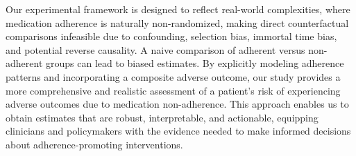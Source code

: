 Our experimental framework is designed to reflect real-world complexities, where medication adherence is naturally non-randomized, making direct counterfactual comparisons infeasible due to confounding, selection bias, immortal time bias, and potential reverse causality. 
A naive comparison of adherent versus non-adherent groups can lead to biased estimates. 
By explicitly modeling adherence patterns and incorporating a composite adverse outcome, our study provides a more comprehensive and realistic assessment of a patient's risk of experiencing adverse outcomes due to medication non-adherence. 
This approach enables us to obtain estimates that are robust, interpretable, and actionable, equipping clinicians and policymakers with the evidence needed to make informed decisions about adherence-promoting interventions.
